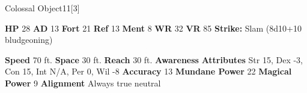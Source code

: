   

  \begin{monsubsection}{Colossal Object}{11}[3]
    \vspace{-1em}\vspace{-1em}
    \vspace{0em}

    
    

    \begin{spellcontent}
      \begin{spelltargetinginfo}
        \pari \textbf{HP} 28 \monsep
          \textbf{AD} 13 \monsep
          \textbf{Fort} 21 \monsep
          \textbf{Ref} 13 \monsep
          \textbf{Ment} 8
        \pari \textbf{WR} 32 \monsep
        \textbf{VR} 85
        \pari \textbf{Strike:}
            Slam  (8d10+10 bludgeoning)
      \end{spelltargetinginfo}
    \end{spellcontent}
    \begin{monsterfooter}
      \pari \textbf{Speed} 70 ft. \monsep
        \textbf{Space} 30 ft. \monsep
        \textbf{Reach} 30 ft.
      \pari \textbf{Awareness} 
      \pari \textbf{Attributes}
        Str 15, Dex -3,
        Con 15, Int N/A,
        Per 0, Wil -8
      \pari \textbf{Accuracy} 13 \monsep
        \textbf{Mundane Power} 22 \monsep
      \textbf{Magical Power} 9
      \pari \textbf{Alignment} Always true neutral
    \end{monsterfooter}
  \end{monsubsection}
  
  
  
